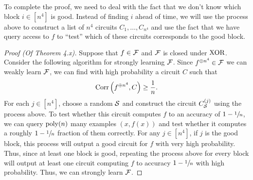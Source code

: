 \documentclass[11pt]{article}
\begin{document}
To complete the proof, we need to deal with the fact that we don't know which block $i \in [n^4]$ is good. Instead of finding $i$ ahead of time, we will use the process above to construct a list of $n^4$ circuits $C_1, \ldots, C_{n^4}$ and use the fact that we have query access to $f$ to ``test'' which of these circuits corresponds to the good block.

\begin{proof}[Proof \textup{(Of Theorem 4.x)}]
    Suppose that $f \in \mathcal{F}$ and $\mathcal{F}$ is closed under $\textup{XOR}{}$. Consider the following algorithm for strongly learning $\mathcal{F}$. Since $f^{\oplus n^4} \in \mathcal{F}$ we can weakly learn $\mathcal{F}$, we can find with high probability a circuit $C$ such that 
    \begin{equation*}
        \mathrm{Corr}\left(f^{\oplus n^4}, C\right) \geq \frac{1}{n}.
    \end{equation*}
    For each $j \in [n^4]$, choose a random $\mathcal{S}$ and construct the circuit $C_{\mathcal{S}}^{(j)}$ using the process above. To test whether this circuit computes $f$ to an accuracy of $1 - \sfrac{1}{n}$, we can query $\mathrm{poly}(n)$ many examples $(x, f(x))$ and test whether it computes a roughly $1 - \sfrac{1}{n}$ fraction of them correctly. For any $j \in [n^4]$, if $j$ is the good block, this process will output a good circuit for $f$ with very high probability. Thus, since at least one block is good, repeating the process above for every block will output at least one circuit computing $f$ to accuracy $1 - \sfrac{1}{n}$ with high probability. Thus, we can strongly learn $\mathcal{F}$.
\end{proof}



\end{document}
